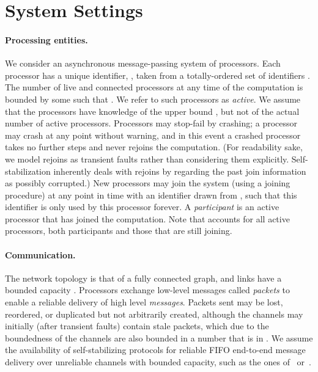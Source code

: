 \documentclass[11pt]{article}
\begin{document}
\section{System Settings}\label{sec:settings} \label{s:sys}
\paragraph{Processing entities.} We consider an asynchronous message-passing system of processors. 
Each processor  has a unique identifier, , taken from a totally-ordered set of identifiers . 
The number of live and connected processors at any time of the computation is bounded by some  such that .  We refer to such processors as \emph{active}. 
We assume that the processors have knowledge of the upper bound , but not of the actual number of active processors.
Processors may stop-fail by crashing; a processor may crash at any point without warning, and in this event a crashed processor takes no further steps and never rejoins the computation. 
(For readability sake, we model rejoins as transient faults rather than considering them explicitly. 
Self-stabilization inherently deals with rejoins by regarding the past join information as possibly corrupted.)
New processors may join the system (using a joining procedure) at any point in time with an identifier drawn from , such that this identifier is only used by this processor forever.
A \emph{participant} is an active processor that has joined the computation.
Note that  accounts for all active processors, both participants and those that are still joining. \vspace{.3em}



\paragraph{Communication.} The network topology is that of a fully connected graph, and links have a bounded capacity .
Processors exchange low-level messages called \emph{packets} to enable a reliable delivery of high level
\emph{messages}. 
Packets sent may be lost, reordered, or duplicated but not arbitrarily created, although the channels may initially (after transient faults) contain stale packets, which due to the boundedness of the channels are also bounded in a number that is in .
We assume the availability of self-stabilizing protocols for reliable FIFO end-to-end message delivery over unreliable channels with bounded capacity, such as the ones of~\cite{DBLP:journals/ipl/DolevDPT11} or~\cite{DBLP:conf/sss/DolevHSS12}.
\end{document}
